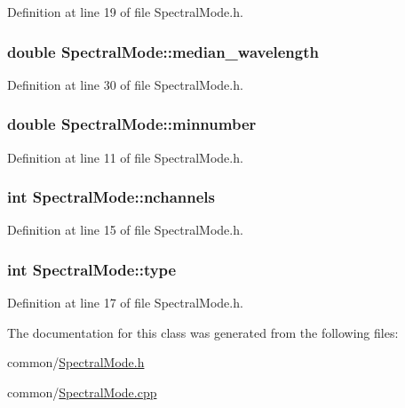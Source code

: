 Definition at line 19 of file SpectralMode.h.

\hypertarget{classSpectralMode_a8c817cc0d2f5d57823a03256743260b3}{
\subsubsection[{median\_\-wavelength}]{\setlength{\rightskip}{0pt plus 5cm}double {\bf SpectralMode::median\_\-wavelength}}}
\label{classSpectralMode_a8c817cc0d2f5d57823a03256743260b3}


Definition at line 30 of file SpectralMode.h.

\hypertarget{classSpectralMode_a702eb517e9b821c6fc6508fa6b96579c}{
\subsubsection[{minnumber}]{\setlength{\rightskip}{0pt plus 5cm}double {\bf SpectralMode::minnumber}}}
\label{classSpectralMode_a702eb517e9b821c6fc6508fa6b96579c}


Definition at line 11 of file SpectralMode.h.

\hypertarget{classSpectralMode_a7c68010a64d612a452df276003689eca}{
\subsubsection[{nchannels}]{\setlength{\rightskip}{0pt plus 5cm}int {\bf SpectralMode::nchannels}}}
\label{classSpectralMode_a7c68010a64d612a452df276003689eca}


Definition at line 15 of file SpectralMode.h.

\hypertarget{classSpectralMode_a7720aa3a3f0d28c755169f86a3125d58}{
\subsubsection[{type}]{\setlength{\rightskip}{0pt plus 5cm}int {\bf SpectralMode::type}}}
\label{classSpectralMode_a7720aa3a3f0d28c755169f86a3125d58}


Definition at line 17 of file SpectralMode.h.



The documentation for this class was generated from the following files:\begin{DoxyCompactItemize}
\item 
common/\hyperlink{SpectralMode_8h}{SpectralMode.h}\item 
common/\hyperlink{SpectralMode_8cpp}{SpectralMode.cpp}\end{DoxyCompactItemize}
